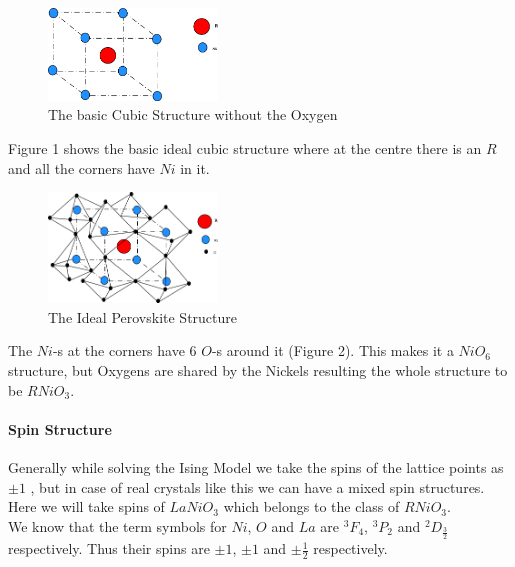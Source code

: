 \documentclass[20pt]{article}
\begin{document}
\begin{figure}[h!]
\centering
	\includegraphics[width=0.4\textwidth]{RNiO3_2.png}
	\caption{The basic Cubic Structure without the Oxygen}
	\end{figure}
	
Figure 1 shows the basic ideal cubic structure where at the centre there is an $R$ and all the corners have $Ni$ in it.
\begin{figure}[h!]
\centering
	\includegraphics[width=0.4\textwidth]{RNiO3.png}
	\caption{The Ideal Perovskite Structure }
	\end{figure}

The $Ni$-s at the corners have 6 $O$-s around it (Figure 2). This makes it a $NiO_6$ structure, but Oxygens are shared by the Nickels resulting the whole structure to be $RNiO_3$.\\

\paragraph*{Spin Structure\\}
Generally while solving the Ising Model we take the spins of the lattice points as $\pm1$ , but in case of real crystals like this we can have a mixed spin structures. Here we will take spins of $LaNiO_3$ which belongs to the class of $RNiO_3$.\\
We know that the term symbols for $Ni$, $O$ and $La$ are $^3F_4$, $^3P_2$ and  $^2D_{\frac{3}{2}}$ respectively. Thus their spins are $\pm 1$, $\pm 1$ and $\pm\frac{1}{2}$ respectively. 
\end{document}
